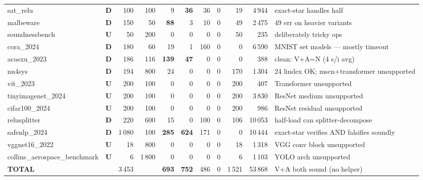 \documentclass[10pt]{beamer}
\newcommand{\sdone}{{\color{cdone}\textbf{D}}}
\newcommand{\sunsup}{{\color{cunsup}\textbf{U}}}
\newcommand{\sblock}{{\color{cwarn}\textbf{B}}}
\begin{document}
\begin{frame}[fragile]
\begin{tabular}{l c r r r r r r r r l}
sat\_relu                       & \sdone  & 100  & 100  & 9   & \textbf{36} & 36 & 0 & 19 & 4\,944 & exact-star handles half \\
malbeware                       & \sdone  & 150  & 50   & \textbf{88} & 3 & 10 & 0 & 49 & 2\,475 & 49 err on heavier variants \\
soundnessbench                  & \sunsup & 50   & 200  & 0   & 0   & 0   & 0 & 50  & 235     & deliberately tricky ops \\
cora\_2024                      & \sdone  & 180  & 60   & 19  & 1   & 160 & 0 & 0  & 6\,590  & MNIST set models — mostly timeout \\
acasxu\_2023                    & \sdone  & 186  & 116  & \textbf{139} & \textbf{47} & 0 & 0 & 0 & 388 & clean: V+A=N (4 s/i avg) \\
nn4sys                          & \sdone  & 194  & 800  & 24  & 0   & 0   & 0 & 170 & 1\,304 & 24 lindex OK; mscn+transformer unsupported \\
vit\_2023                       & \sunsup & 200  & 100  & 0   & 0   & 0   & 0 & 200 & 407     & Transformer unsupported \\
tinyimagenet\_2024              & \sunsup & 200  & 100  & 0   & 0   & 0   & 0 & 200 & 3\,830  & ResNet medium unsupported \\
cifar100\_2024                  & \sunsup & 200  & 100  & 0   & 0   & 0   & 0 & 200 & 986     & ResNet residual unsupported \\
relusplitter                    & \sdone  & 220  & 600  & 15  & 0   & 100 & 0 & 106 & 10\,053 & half-load can splitter-decompose \\
safenlp\_2024                   & \sdone  & 1\,080 & 100 & \textbf{285} & \textbf{624} & 171 & 0 & 0 & 10\,444 & exact-star verifies AND falsifies soundly \\
vggnet16\_2022                  & \sunsup & 18   & 800  & 0   & 0   & 0   & 0 & 18  & 1\,318  & VGG conv block unsupported \\
collins\_aerospace\_benchmark   & \sunsup & 6    & 1\,800 & 0 & 0   & 0   & 0 & 6   & 1\,103  & YOLO arch unsupported \\
\midrule
\textbf{TOTAL}                  &         & 3\,453 &      & \textbf{693} & \textbf{752} & 486 & 0 & 1\,521 & 53\,868 & V+A both sound (no helper) \\
\bottomrule
\end{tabular}

\vspace{0.5em}
\caption*{\tiny
\sdone\ = ran to completion;\quad
\sunsup\ = nnenum cannot load this model architecture (unsupported op);\quad
\sblock\ = blocked (none in this sweep).
\textbf{V} sound UNSAT,\ \textbf{A} sound SAT (witnessed by exact-star),\ \textbf{T} timeout,\ \textbf{U} unknown,\ \textbf{E} tool unsupported.
Total time excludes wrapper overhead. Two-lane parallel sweep, \texttt{-p 8} workers each, \texttt{nice +10}.
\textbf{Helper status:} no PGD / random sampling / falsification heuristic exists in nnenum source — attack-free by construction.
}

\end{frame}
\end{document}
